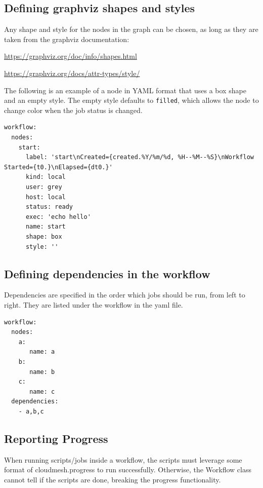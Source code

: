 \subsection{Defining graphviz shapes and
styles}\label{defining-graphviz-shapes-and-styles}

Any shape and style for the nodes in the graph can be chosen, as long as
they are taken from the graphviz documentation:

\url{https://graphviz.org/doc/info/shapes.html}

\url{https://graphviz.org/docs/attr-types/style/}

The following is an example of a node in YAML format that uses a box
shape and an empty style. The empty style defaults to \texttt{filled},
which allows the node to change color when the job status is changed.

\begin{verbatim}
workflow:
  nodes:
    start:
      label: 'start\nCreated={created.%Y/%m/%d, %H--%M--%S}\nWorkflow Started={t0.}\nElapsed={dt0.}'
      kind: local
      user: grey
      host: local
      status: ready
      exec: 'echo hello'
      name: start
      shape: box
      style: ''
\end{verbatim}

\subsection{Defining dependencies in the
workflow}\label{defining-dependencies-in-the-workflow}

Dependencies are specified in the order which jobs should be run, from
left to right. They are listed under the workflow in the yaml file.

\begin{verbatim}
workflow:
  nodes:
    a:
       name: a
    b:
       name: b
    c:
       name: c
  dependencies:
    - a,b,c
\end{verbatim}

\subsection{Reporting Progress}\label{reporting-progress}

When running scripts/jobs inside a workflow, the scripts must leverage
some format of cloudmesh.progress to run successfully. Otherwise, the
Workflow class cannot tell if the scripts are done, breaking the
progress functionality.

